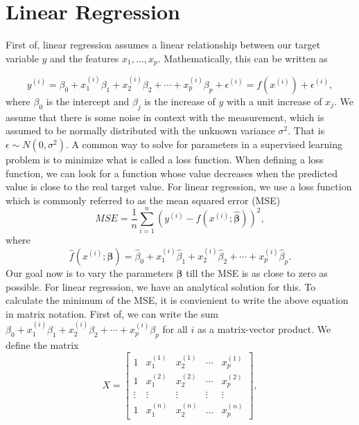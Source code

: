 \section{Linear Regression}
\label{sec:SupLearnLinReg}

First of, linear regression assumes a linear relationship between our target variable $y$ and the features $x_1, ... , x_p$. Mathematically, this can be written as

\begin{equation}
\label{eq:LinearRegression1}
y^{(i)} = \beta_0 + x_1^{(i)}\beta_1 + x_2^{(i)}\beta_2 + \cdots + x_p^{(i)}\beta_p + \epsilon^{(i)} = f(x^{(i)}) + \epsilon^{(i)}, 
\end{equation}
where $\beta_0$ is the intercept and $\beta_j$ is the increase of $y$ with a unit increase of $x_j$. We assume that there is some noise in context with the measurement, which is assumed to be normally distributed with the unknown variance $\sigma^2$. That is $\epsilon \sim N(0,\sigma^2)$.
A common way to solve for parameters in a supervised learning problem is to minimize what is called a loss function. When defining a loss function, we can look for a function whose value decreases when the predicted value is close to the real target value. For linear regression, we use a loss function which is commonly referred to as the mean squared error (MSE)
\begin{equation}
    \label{eq:MSE}
    MSE = \frac{1}{n}\sum_{i=1}^{n}(y^{(i)} - \hat{f}(x^{(i)}; \hat{\boldsymbol{\beta}}))^2,
\end{equation}
where 
$$\hat{f}(x^{(i)}; \hat{\boldsymbol{\beta}}) = \hat{\beta}_0 + x_1^{(i)}\hat{\beta}_1 + x_2^{(i)}\hat{\beta}_2 + \cdots + x_p^{(i)}\hat{\beta}_p.$$
Our goal now is to vary the parameters $\hat{\boldsymbol{\beta}}$ till the MSE is as close to zero as possible. For linear regression, we have an analytical solution for this. To calculate the minimum of the MSE, it is convienient to write the above equation in matrix notation. First of, we can write the sum $\beta_0 + x_1^{(i)}\beta_1 + x_2^{(i)}\beta_2 + \cdots + x_p^{(i)}\beta_p$ for all $i$ as a matrix-vector product. We define the matrix
$$ X =
\begin{bmatrix}
    1       & x_{1}^{(1)} & x_{2}^{(1)} & \cdots & x_{p}^{(1)} \\
    1       & x_{1}^{(2)} & x_{2}^{(2)} & \cdots & x_{p}^{(2)} \\
    \vdots & \vdots & \vdots & \vdots & \vdots \\
    1       & x_{1}^{(n)} & x_{2}^{(n)} & \dots & x_{p}^{(n)} 
\end{bmatrix},
$$
